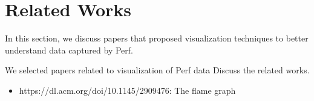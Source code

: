 \section{Related Works}

In this section, we discuss papers that proposed visualization techniques to better understand data captured by Perf.

We selected papers related to visualization of Perf data
Discuss the related works.

\begin{itemize}
	\item https://dl.acm.org/doi/10.1145/2909476: The flame graph
\end{itemize}
